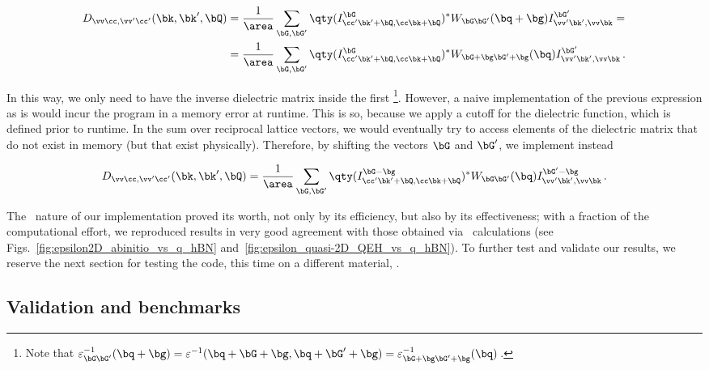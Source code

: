 \begin{equation}
    \begin{aligned}
    D_{\vv \cc , \vv ' \cc '}(\bk,\bk',\bQ) &= \frac{1}{\area} \sum_{\bG,\bG'} \qty(I^{\bG}_{\cc ' \bk'+\bQ, \cc  \bk+\bQ})^* W_{\bG \bG'}(\bq + \bg) I^{\bG'}_{\vv ' \bk',\vv \bk} = \\
                                            &= \frac{1}{\area} \sum_{\bG,\bG'} \qty(I^{\bG}_{\cc ' \bk'+\bQ, \cc  \bk+\bQ})^* W_{\bG + \bg \bG' + \bg}(\bq) I^{\bG'}_{\vv ' \bk',\vv \bk} \,.
    \end{aligned}
\end{equation}

\noindent In this way, we only need to have the inverse dielectric matrix inside the first \bz\@\footnote{Note that $\varepsilon^{-1}_{\bG \bG'} (\bq + \bg) = \varepsilon^{-1}(\bq + \bG + \bg,\bq + \bG' + \bg) = \varepsilon^{-1}_{\bG+\bg \bG'+\bg} (\bq)$\,.}.
However, a naive implementation of the previous expression as is would incur the program in a memory error at runtime.
This is so, because we apply a cutoff for the dielectric function, which is defined prior to runtime.
In the sum over reciprocal lattice vectors, we would eventually try to access elements of the dielectric matrix that do not exist in memory (but that exist physically).
Therefore, by shifting the vectors $\bG$ and $\bG'$, we implement instead

\begin{equation}
    D_{\vv \cc , \vv ' \cc '}(\bk,\bk',\bQ) = \frac{1}{\area} \sum_{\bG,\bG'} \qty(I^{\bG - \bg}_{\cc ' \bk'+\bQ, \cc  \bk+\bQ})^* W_{\bG \bG'}(\bq) I^{\bG' - \bg}_{\vv ' \bk',\vv \bk}\,.
\end{equation}

The \bd~nature of our implementation proved its worth, not only by its efficiency, but also by its effectiveness; with a fraction of the computational effort, we reproduced results in very good agreement with those obtained via \abinit~calculations (see Figs.~\ref{fig:epsilon2D_abinitio_vs_q_hBN} and~\ref{fig:epsilon_quasi-2D_QEH_vs_q_hBN}).
To further test and validate our results, we reserve the next section for testing the code, this time on a different material, .





\subsection{Validation and benchmarks}
\label{subsec:benchmark_and_validation}

